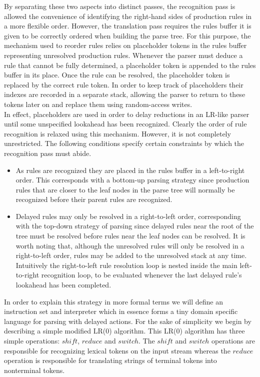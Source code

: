 \documentclass[a4paper,11pt]{article}
\begin{document}
By separating these two aspects into distinct passes, the recognition pass is allowed the convenience of identifying the right-hand sides of production rules in a more flexible order. 
However, the translation pass requires the rules buffer it is given to be correctly ordered when building the parse tree.
For this purpose, the mechanism used to reorder rules relies on placeholder tokens in the rules buffer representing unresolved production rules.
Whenever the parser must deduce a rule that cannot be fully determined, a placeholder token is appended to the rules buffer in its place. 
Once the rule can be resolved, the placeholder token is replaced by the correct rule token.
In order to keep track of placeholders their indexes are recorded in a separate stack, allowing the parser to return to these tokens later on and replace them using random-access writes.\\

In effect, placeholders are used in order to delay reductions in an LR-like parser until some unspecified lookahead has been recognized.
Clearly the order of rule recognition is relaxed using this mechanism.
However, it is not completely unrestricted.
The following conditions specify certain constraints by which the recognition pass must abide.

\begin{itemize}
\item As rules are recognized they are placed in the rules buffer in a left-to-right order. This corresponds with a bottom-up parsing strategy since production rules that are closer to the leaf nodes in the parse tree will normally be recognized before their parent rules are recognized.
\item Delayed rules may only be resolved in a right-to-left order, corresponding with the top-down strategy of parsing since delayed rules near the root of the tree must be resolved before 
rules near the leaf nodes can be resolved. 
It is worth noting that, although the unresolved rules will only be resolved in a right-to-left order, rules may be added to the unresolved stack at any time.
Intuitively the right-to-left rule resolution loop is nested inside the main left-to-right recognition loop, to be evaluated whenever the last delayed rule's lookahead has been completed.
\end{itemize}

In order to explain this strategy in more formal terms we will define an instruction set and interpreter which in essence forms a tiny domain specific language for parsing with delayed actions.
For the sake of simplicity we begin by describing a simple modified LR(0) algorithm. This LR(0) algorithm has three simple operations: $shift$, $reduce$ and $switch$. 
The $shift$ and $switch$ operations are responsible for recognizing lexical tokens on the input stream whereas the $reduce$ operation is responsible for translating strings of terminal tokens into nonterminal tokens.
\end{document}
